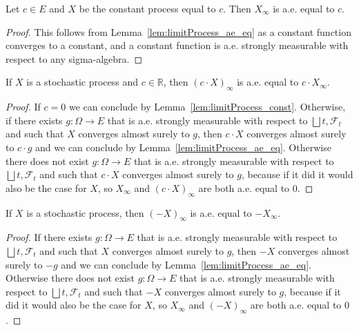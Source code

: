 \begin{lemma}\label{lem:limitProcess_const}
  \leanok
  Let $c \in E$ and $X$ be the constant process equal to $c$. Then $X_\infty$ is a.e. equal to $c$.
\end{lemma}

\begin{proof}
  This follows from Lemma~\ref{lem:limitProcess_ae_eq} as a constant function converges to a constant, and a constant function is a.e. strongly measurable with respect to any sigma-algebra.
\end{proof}

\begin{lemma}\label{lem:limitProcess_smul}
  \leanok
  If $X$ is a stochastic process and $c \in \mathbb{R}$, then $(c \cdot X)_\infty$ is a.e. equal to $c \cdot X_\infty$.
\end{lemma}

\begin{proof}
  If $c = 0$ we can conclude by Lemma~\ref{lem:limitProcess_const}. Otherwise, if there exists $g : \Omega \to E$ that is a.e. strongly measurable with respect to $\bigsqcup t, \mathcal{F}_t$ and such that $X$ converges almost surely to $g$, then $c \cdot X$ converges almost surely to $c \cdot g$ and we can conclude by Lemma~\ref{lem:limitProcess_ae_eq}. Otherwise there does not exist $g : \Omega \to E$ that is a.e. strongly measurable with respect to $\bigsqcup t, \mathcal{F}_t$ and such that $c \cdot X$ converges almost surely to $g$, because if it did it would also be the case for $X$, so $X_\infty$ and $(c \cdot X)_\infty$ are both a.e. equal to $0$.
\end{proof}

\begin{lemma}\label{lem:limitProcess_neg}
  \leanok
  If $X$ is a stochastic process, then $(-X)_\infty$ is a.e. equal to $-X_\infty$.
\end{lemma}

\begin{proof}
  If there exists $g : \Omega \to E$ that is a.e. strongly measurable with respect to $\bigsqcup t, \mathcal{F}_t$ and such that $X$ converges almost surely to $g$, then $-X$ converges almost surely to $-g$ and we can conclude by Lemma~\ref{lem:limitProcess_ae_eq}. Otherwise there does not exist $g : \Omega \to E$ that is a.e. strongly measurable with respect to $\bigsqcup t, \mathcal{F}_t$ and such that $-X$ converges almost surely to $g$, because if it did it would also be the case for $X$, so $X_\infty$ and $(-X)_\infty$ are both a.e. equal to $0$.
\end{proof}


